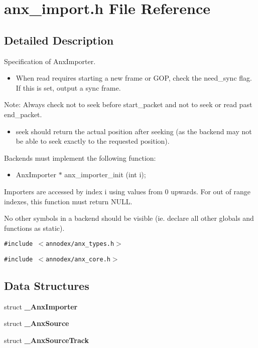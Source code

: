 \section{anx\_\-import.h File Reference}
\label{anx__import_8h}


\subsection{Detailed Description}
Specification of Anx\-Importer. 

\begin{itemize}
\item When read requires starting a new frame or GOP, check the need\_\-sync flag. If this is set, output a sync frame.\end{itemize}


\begin{Desc}
\item[Note:]Always check not to seek before start\_\-packet and not to seek or read past end\_\-packet.\end{Desc}
\begin{itemize}
\item seek should return the actual position after seeking (as the backend may not be able to seek exactly to the requested position).\end{itemize}


Backends must implement the following function:

\begin{itemize}
\item Anx\-Importer $\ast$ anx\_\-importer\_\-init (int i);\end{itemize}


Importers are accessed by index i using values from 0 upwards. For out of range indexes, this function must return NULL.

No other symbols in a backend should be visible (ie. declare all other globals and functions as static).

{\tt \#include $<$annodex/anx\_\-types.h$>$}\par
{\tt \#include $<$annodex/anx\_\-core.h$>$}\par
\subsection*{Data Structures}
\begin{CompactItemize}
\item 
struct {\bf \_\-Anx\-Importer}
\item 
struct {\bf \_\-Anx\-Source}
\item 
struct {\bf \_\-Anx\-Source\-Track}
\end{CompactItemize}
